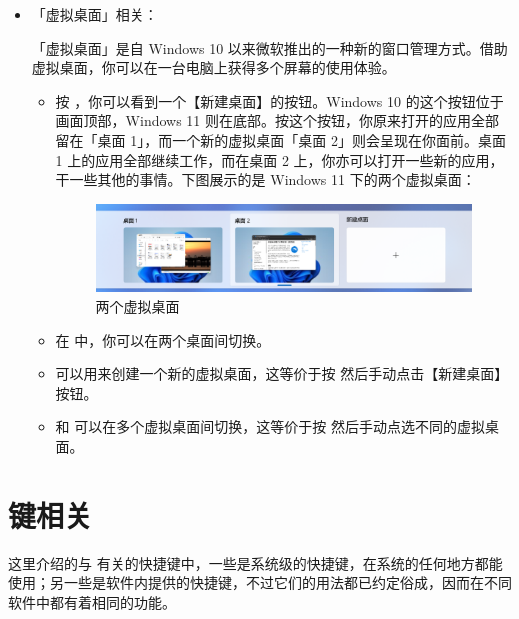 \begin{itemize}
  \item 「虚拟桌面」相关：

  「虚拟桌面」是自 Windows 10 以来微软推出的一种新的窗口管理方式。借助虚拟桌面，你可以在一台电脑上获得多个屏幕的使用体验。
  \begin{itemize}
    \item 按 ，你可以看到一个【新建桌面】的按钮。Windows 10 的这个按钮位于画面顶部，Windows 11 则在底部。按这个按钮，你原来打开的应用全部留在「桌面 1」，而一个新的虚拟桌面「桌面 2」则会呈现在你面前。桌面 1 上的应用全部继续工作，而在桌面 2 上，你亦可以打开一些新的应用，干一些其他的事情。下图展示的是 Windows 11 下的两个虚拟桌面：
      \begin{figure}[htb!]
        \centering
        \includegraphics[width=.85\textwidth]{assets/basic/Virtual_desktop.png}
        \caption{两个虚拟桌面}
        \label{fig:Virtual_desktop}
      \end{figure}
    \item 在  中，你可以在两个桌面间切换。    
    \item {} 可以用来创建一个新的虚拟桌面，这等价于按  然后手动点击【新建桌面】按钮。
    \item {} 和  可以在多个虚拟桌面间切换，这等价于按  然后手动点选不同的虚拟桌面。
  \end{itemize}
\end{itemize}

\section{ 键相关}

这里介绍的与  有关的快捷键中，一些是系统级的快捷键，在系统的任何地方都能使用；另一些是软件内提供的快捷键，不过它们的用法都已约定俗成，因而在不同软件中都有着相同的功能。

